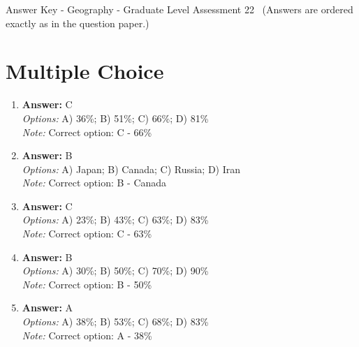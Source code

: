 \documentclass[12pt]{article}
\begin{document}
\begin{center}
Answer Key - Geography - Graduate Level Assessment 22 \
\small (Answers are ordered exactly as in the question paper.)
\end{center}

\section*{Multiple Choice}
\begin{enumerate}[label=\arabic*.]
\item \textbf{Answer:} C
\\ \textit{Options:} A) 36\%; B) 51\%; C) 66\%; D) 81\%
\\ \textit{Note:} Correct option: C - 66\%
\item \textbf{Answer:} B
\\ \textit{Options:} A) Japan; B) Canada; C) Russia; D) Iran
\\ \textit{Note:} Correct option: B - Canada
\item \textbf{Answer:} C
\\ \textit{Options:} A) 23\%; B) 43\%; C) 63\%; D) 83\%
\\ \textit{Note:} Correct option: C - 63\%
\item \textbf{Answer:} B
\\ \textit{Options:} A) 30\%; B) 50\%; C) 70\%; D) 90\%
\\ \textit{Note:} Correct option: B - 50\%
\item \textbf{Answer:} A
\\ \textit{Options:} A) 38\%; B) 53\%; C) 68\%; D) 83\%
\\ \textit{Note:} Correct option: A - 38\%
\end{enumerate}
\end{document}
